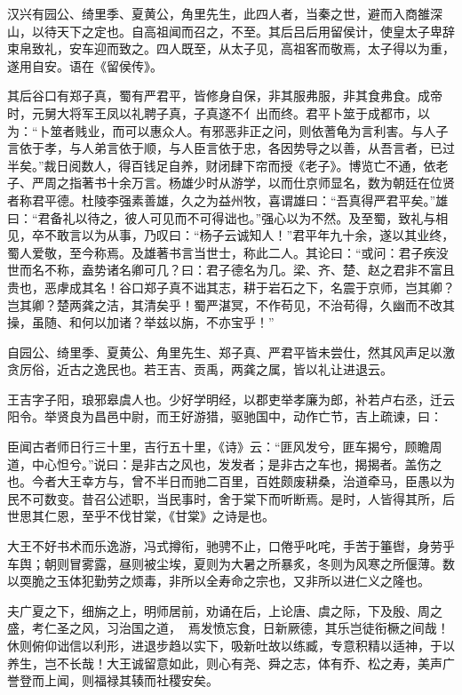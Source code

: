 \documentclass[]{article}
\begin{document}
汉兴有园公、绮里季、夏黄公，角里先生，此四人者，当秦之世，避而入商雒深山，以待天下之定也。自高祖闻而召之，不至。其后吕后用留侯计，使皇太子卑辞束帛致礼，安车迎而致之。四人既至，从太子见，高祖客而敬焉，太子得以为重，遂用自安。语在《留侯传》。

其后谷口有郑子真，蜀有严君平，皆修身自保，非其服弗服，非其食弗食。成帝时，元舅大将军王凤以礼聘子真，子真遂不亻出而终。君平卜筮于成都市，以为：``卜筮者贱业，而可以惠众人。有邪恶非正之问，则依蓍龟为言利害。与人子言依于孝，与人弟言依于顺，与人臣言依于忠，各因势导之以善，从吾言者，已过半矣。''裁日阅数人，得百钱足自养，财闭肆下帘而授《老子》。博览亡不通，依老子、严周之指著书十余万言。杨雄少时从游学，以而仕京师显名，数为朝廷在位贤者称君平德。杜陵李强素善雄，久之为益州牧，喜谓雄曰：``吾真得严君平矣。''雄曰：``君备礼以待之，彼人可见而不可得诎也。''强心以为不然。及至蜀，致礼与相见，卒不敢言以为从事，乃叹曰：``杨子云诚知人！''君平年九十余，遂以其业终，蜀人爱敬，至今称焉。及雄著书言当世士，称此二人。其论曰：``或问：君子疾没世而名不称，盍势诸名卿可几？曰：君子德名为几。梁、齐、楚、赵之君非不富且贵也，恶虖成其名！谷口郑子真不诎其志，耕于岩石之下，名震于京师，岂其卿？岂其卿？楚两龚之洁，其清矣乎！蜀严湛冥，不作苟见，不治苟得，久幽而不改其操，虽随、和何以加诸？举兹以旃，不亦宝乎！''

自园公、绮里季、夏黄公、角里先生、郑子真、严君平皆未尝仕，然其风声足以激贪厉俗，近古之逸民也。若王吉、贡禹，两龚之属，皆以礼让进退云。

王吉字子阳，琅邪皋虞人也。少好学明经，以郡吏举孝廉为郎，补若卢右丞，迁云阳令。举贤良为昌邑中尉，而王好游猎，驱驰国中，动作亡节，吉上疏谏，曰：

臣闻古者师日行三十里，吉行五十里，《诗》云：``匪风发兮，匪车揭兮，顾瞻周道，中心怛兮。''说曰：是非古之风也，发发者；是非古之车也，揭揭者。盖伤之也。今者大王幸方与，曾不半日而驰二百里，百姓颇废耕桑，治道牵马，臣愚以为民不可数变。昔召公述职，当民事时，舍于棠下而听断焉。是时，人皆得其所，后世思其仁恩，至乎不伐甘棠，《甘棠》之诗是也。

大王不好书术而乐逸游，冯式撙衔，驰骋不止，口倦乎叱咤，手苦于箠辔，身劳乎车舆；朝则冒雾露，昼则被尘埃，夏则为大暑之所暴炙，冬则为风寒之所偃薄。数以耎脆之玉体犯勤劳之烦毒，非所以全寿命之宗也，又非所以进仁义之隆也。

夫广夏之下，细旃之上，明师居前，劝诵在后，上论唐、虞之际，下及殷、周之盛，考仁圣之风，习治国之道，焉发愤忘食，日新厥德，其乐岂徒衔橛之间哉！休则俯仰诎信以利形，进退步趋以实下，吸新吐故以练臧，专意积精以适神，于以养生，岂不长哉！大王诚留意如此，则心有尧、舜之志，体有乔、松之寿，美声广誉登而上闻，则福禄其辏而社稷安矣。
\end{document}
